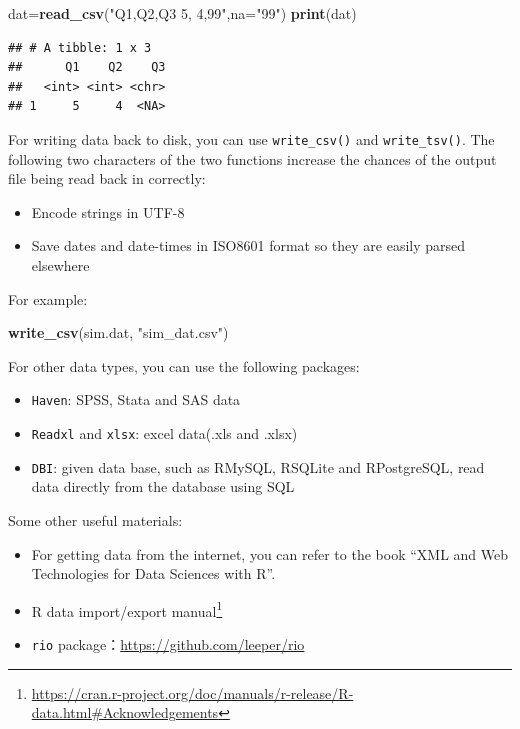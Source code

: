 \documentclass[12pt,]{krantz}
\newenvironment{Shaded}{\begin{snugshade}}{\end{snugshade}}
\newcommand{\KeywordTok}[1]{\textcolor[rgb]{0.13,0.29,0.53}{\textbf{{#1}}}}
\newcommand{\DataTypeTok}[1]{\textcolor[rgb]{0.13,0.29,0.53}{{#1}}}
\newcommand{\StringTok}[1]{\textcolor[rgb]{0.31,0.60,0.02}{{#1}}}
\newcommand{\NormalTok}[1]{{#1}}
\providecommand{\tightlist}{%
  \setlength{\itemsep}{0pt}\setlength{\parskip}{0pt}}
\renewcommand{\href}[2]{#2\footnote{\url{#1}}}
\theoremstyle{definition}
\theoremstyle{definition}
\theoremstyle{remark}
\begin{document}
\begin{Shaded}
\begin{Highlighting}[]
\NormalTok{dat=}\KeywordTok{read_csv}\NormalTok{(}\StringTok{"Q1,Q2,Q3}
\StringTok{               5, 4,99"}\NormalTok{,}\DataTypeTok{na=}\StringTok{"99"}\NormalTok{)}
\KeywordTok{print}\NormalTok{(dat)}
\end{Highlighting}
\end{Shaded}

\begin{verbatim}
## # A tibble: 1 x 3
##      Q1    Q2    Q3
##   <int> <int> <chr>
## 1     5     4  <NA>
\end{verbatim}

For writing data back to disk, you can use \texttt{write\_csv()} and
\texttt{write\_tsv()}. The following two characters of the two functions
increase the chances of the output file being read back in correctly:

\begin{itemize}
\tightlist
\item
  Encode strings in UTF-8
\item
  Save dates and date-times in ISO8601 format so they are easily parsed
  elsewhere
\end{itemize}

For example:

\begin{Shaded}
\begin{Highlighting}[]
\KeywordTok{write_csv}\NormalTok{(sim.dat, }\StringTok{"sim_dat.csv"}\NormalTok{)}
\end{Highlighting}
\end{Shaded}

For other data types, you can use the following packages:

\begin{itemize}
\tightlist
\item
  \texttt{Haven}: SPSS, Stata and SAS data
\item
  \texttt{Readxl} and \texttt{xlsx}: excel data(.xls and .xlsx)
\item
  \texttt{DBI}: given data base, such as RMySQL, RSQLite and
  RPostgreSQL, read data directly from the database using SQL
\end{itemize}

Some other useful materials:

\begin{itemize}
\tightlist
\item
  For getting data from the internet, you can refer to the book ``XML
  and Web Technologies for Data Sciences with R''.\\
\item
  \href{https://cran.r-project.org/doc/manuals/r-release/R-data.html\#Acknowledgements}{R
  data import/export manual}
\item
  \texttt{rio} package：\url{https://github.com/leeper/rio}
\end{itemize}
\end{document}
